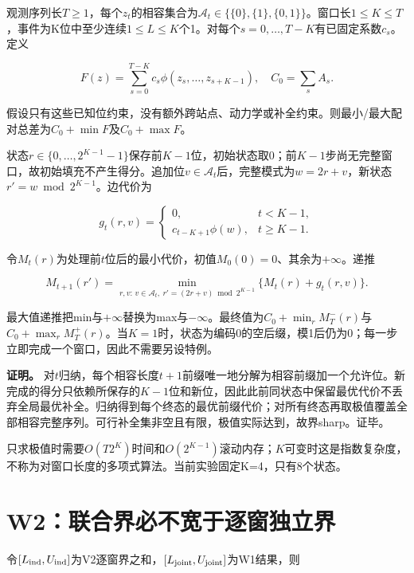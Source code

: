 \documentclass[UTF8,11pt,a4paper,fontset=windows]{ctexart}
\begin{document}
观测序列长$T\ge1$，每个$z_t$的相容集合为$\mathcal A_t\in\{\{0\},\{1\},\{0,1\}\}$。窗口长$1\le K\le T$，事件为K位中至少连续$1\le L\le K$个1。对每个$s=0,\ldots,T-K$有已固定系数$c_s$。定义


\begin{equation}
F(z)=\sum_{s=0}^{T-K}c_s\phi(z_s,\ldots,z_{s+K-1}),\quad C_0=\sum_sA_s.\tag{P2}
\end{equation}

假设只有这些已知位约束，没有额外跨站点、动力学或补全约束。则最小/最大配对总差为$C_0+\min F$及$C_0+\max F$。


状态$r\in\{0,\ldots,2^{K-1}-1\}$保存前$K-1$位，初始状态取0；前$K-1$步尚无完整窗口，故初始填充不产生得分。追加位$v\in\mathcal A_t$后，完整模式为$w=2r+v$，新状态$r'=w\bmod2^{K-1}$。边代价为


\begin{equation}
g_t(r,v)=\begin{cases}0,&t<K-1,\\c_{t-K+1}\phi(w),&t\ge K-1.\end{cases}\tag{P3}
\end{equation}

令$M_t(r)$为处理前$t$位后的最小代价，初值$M_0(0)=0$、其余为$+\infty$。递推


\begin{equation}
M_{t+1}(r')=\min_{r,v: \,v\in\mathcal A_t,\ r'=(2r+v)\bmod2^{K-1}}\{M_t(r)+g_t(r,v)\}.\tag{P4}
\end{equation}

最大值递推把min与$+\infty$替换为max与$-\infty$。最终值为$C_0+\min_r M_T^-(r)$与$C_0+\max_r M_T^+(r)$。当$K=1$时，状态为编码0的空后缀，模1后仍为0；每一步立即完成一个窗口，因此不需要另设特例。


\textbf{证明。} 对$t$归纳，每个相容长度$t+1$前缀唯一地分解为相容前缀加一个允许位。新完成的得分只依赖所保存的$K-1$位和新位，因此此前同状态中保留最优代价不丢弃全局最优补全。归纳得到每个终态的最优前缀代价；对所有终态再取极值覆盖全部相容完整序列。可行补全集非空且有限，极值实际达到，故界sharp。证毕。


只求极值时需要$O(T2^K)$时间和$O(2^{K-1})$滚动内存；$K$可变时这是指数复杂度，不称为对窗口长度的多项式算法。当前实验固定K=4，只有8个状态。


\section{W2：联合界必不宽于逐窗独立界}

令$[L_{\rm ind},U_{\rm ind}]$为V2逐窗界之和，$[L_{\rm joint},U_{\rm joint}]$为W1结果，则
\end{document}
